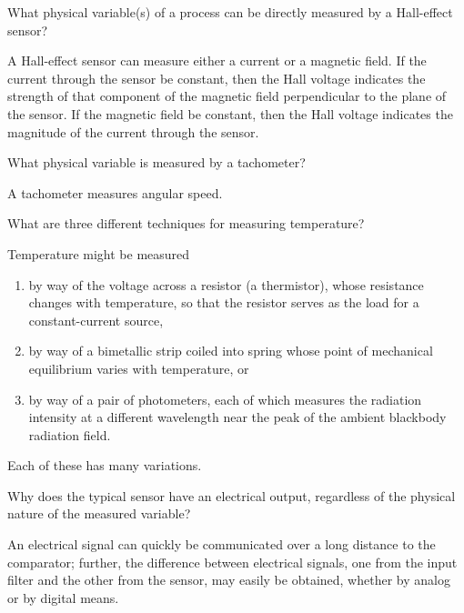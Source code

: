\begin{problem}
   What physical variable(s) of a process can be directly measured by a
   Hall-effect sensor?
\end{problem}

\begin{solution}
   A Hall-effect sensor can measure either a current or a magnetic field. If
   the current through the sensor be constant, then the Hall voltage indicates
   the strength of that component of the magnetic field perpendicular to the
   plane of the sensor. If the magnetic field be constant, then the Hall
   voltage indicates the magnitude of the current through the sensor.
\end{solution}

\begin{problem}
   What physical variable is measured by a tachometer?
\end{problem}

\begin{solution}
   A tachometer measures angular speed.
\end{solution}

\begin{problem}
   What are three different techniques for measuring temperature?
\end{problem}

\begin{solution}
   Temperature might be measured
   \begin{enumerate}
      \item by way of the voltage across a resistor (a thermistor), whose
         resistance changes with temperature, so that the resistor serves as
         the load for a constant-current source,
      \item by way of a bimetallic strip coiled into spring whose point of
         mechanical equilibrium varies with temperature, or
      \item by way of a pair of photometers, each of which measures the
         radiation intensity at a different wavelength near the peak of the
         ambient blackbody radiation field.
   \end{enumerate}
   Each of these has many variations.
\end{solution}

\begin{problem}
   Why does the typical sensor have an electrical output, regardless of the
   physical nature of the measured variable?
\end{problem}

\begin{solution}
   An electrical signal can quickly be communicated over a long distance to the
   comparator; further, the difference between electrical signals, one from the
   input filter and the other from the sensor, may easily be obtained, whether
   by analog or by digital means.
\end{solution}

